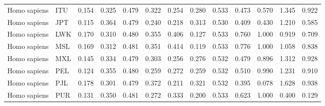 \begin{longtable}{llrrrrrrrrrrr}
        Homo sapiens &                       ITU &                              0.154 &                               0.325 &                 0.479 &                 0.322 &                              0.254 &                               0.280 &                 0.533 &                 0.473 &        0.570 &  1.345 &  0.922 \\
        Homo sapiens &                       JPT &                              0.115 &                               0.364 &                 0.479 &                 0.240 &                              0.218 &                               0.313 &                 0.530 &                 0.409 &        0.430 &  1.210 &  0.585 \\
        Homo sapiens &                       LWK &                              0.170 &                               0.310 &                 0.480 &                 0.355 &                              0.406 &                               0.127 &                 0.533 &                 0.760 &        1.000 &  0.919 &  0.709 \\
        Homo sapiens &                       MSL &                              0.169 &                               0.312 &                 0.481 &                 0.351 &                              0.414 &                               0.119 &                 0.533 &                 0.776 &        1.000 &  1.058 &  0.838 \\
        Homo sapiens &                       MXL &                              0.145 &                               0.334 &                 0.479 &                 0.303 &                              0.256 &                               0.276 &                 0.532 &                 0.479 &        0.896 &  1.312 &  0.928 \\
        Homo sapiens &                       PEL &                              0.124 &                               0.355 &                 0.480 &                 0.259 &                              0.272 &                               0.259 &                 0.532 &                 0.510 &        0.990 &  1.231 &  0.910 \\
        Homo sapiens &                       PJL &                              0.178 &                               0.301 &                 0.479 &                 0.372 &                              0.211 &                               0.321 &                 0.532 &                 0.395 &        0.078 &  1.628 &  0.938 \\
        Homo sapiens &                       PUR &                              0.131 &                               0.350 &                 0.481 &                 0.272 &                              0.333 &                               0.200 &                 0.533 &                 0.623 &        1.000 &  0.400 &  0.129 \\

\end{longtable}
